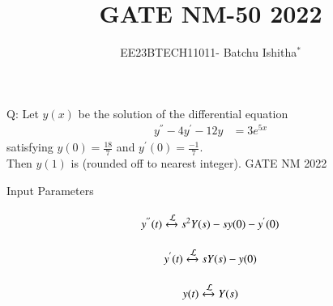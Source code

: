 \documentclass[journal,12pt,twocolumn]{IEEEtran}
\theoremstyle{remark}
\begin{document}
\newcommand\tabref{Table~\ref}
\newcommand{\sinc}{\,\text{sinc}\,}
\newcommand{\rect}{\,\text{rect}\,}

\let\vec\mathbf



\title{ GATE NM-50 2022}
\author{EE23BTECH11011- Batchu Ishitha$^{*}$%
}
\maketitle




\bigskip

\renewcommand{\thefigure}{\theenumi}
\renewcommand{\thetable}{\theenumi}

Q:  Let $y(x)$ be the solution of the differential equation 
\begin{align}
y^{''} - 4y^{'} -12y &= 3e^{5x}
\end{align}
satisfying $y(0)=\frac{18}{7}$ and $y^{'}(0)=\frac{-1}{7}$. \\
Then $y(1)$ is \underline{\hspace{2.5cm}}  (rounded off to nearest integer).      \hfill{GATE NM 2022 }

\solution
\begin{table}[!ht]    
    \centering
    \resizebox{9cm}{1cm}{
         
    }
    \caption{Input Parameters}
    \label{table:ishitha.g22.nm.50.t1}
\end{table}

\begin{equation}
y^{''}(t) \stackrel{}{\xleftrightarrow{\mathcal{L}}} s^{2}Y(s)-sy(0)-y^{'}(0) \\ \label{eq:ishitha.g22.nm.50.1.eq}
\end{equation}

\begin{equation}
y^{'}(t)  \stackrel{}{\xleftrightarrow{\mathcal{L}}} sY(s)-y(0) \\ \label{eq:ishitha.g22.nm.50.2.eq}
\end{equation}

\begin{equation}
y(t)     \stackrel{}{\xleftrightarrow{\mathcal{L}}}   Y(s) \\ \label{eq:ishitha.g22.nm.50.3.eq}
\end{equation}
\end{document}
